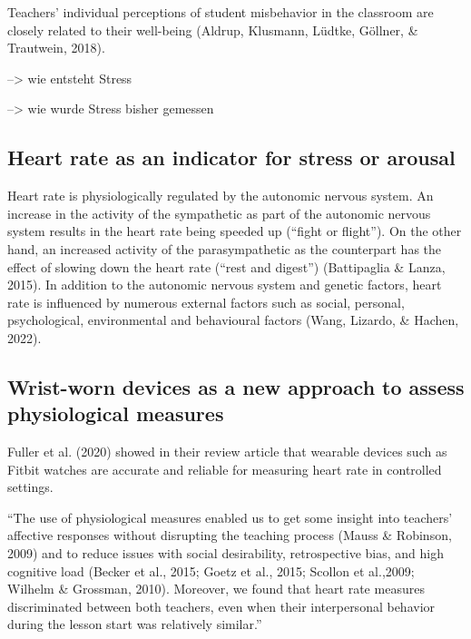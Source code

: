 \documentclass[
  man,floatsintext]{apa6}
\begin{document}
Teachers' individual perceptions of student misbehavior in the classroom are closely related to their well-being (Aldrup, Klusmann, Lüdtke, Göllner, \& Trautwein, 2018).

--\textgreater{} wie entsteht Stress

--\textgreater{} wie wurde Stress bisher gemessen

\hypertarget{heart-rate-as-an-indicator-for-stress-or-arousal}{%
\subsection{Heart rate as an indicator for stress or arousal}\label{heart-rate-as-an-indicator-for-stress-or-arousal}}

Heart rate is physiologically regulated by the autonomic nervous system. An increase in the activity of the sympathetic as part of the autonomic nervous system results in the heart rate being speeded up (``fight or flight''). On the other hand, an increased activity of the parasympathetic as the counterpart has the effect of slowing down the heart rate (``rest and digest'') (Battipaglia \& Lanza, 2015). In addition to the autonomic nervous system and genetic factors, heart rate is influenced by numerous external factors such as social, personal, psychological, environmental and behavioural factors (Wang, Lizardo, \& Hachen, 2022).

\hypertarget{wrist-worn-devices-as-a-new-approach-to-assess-physiological-measures}{%
\subsection{Wrist-worn devices as a new approach to assess physiological measures}\label{wrist-worn-devices-as-a-new-approach-to-assess-physiological-measures}}

Fuller et al. (2020) showed in their review article that wearable devices such as Fitbit watches are accurate and reliable for measuring heart rate in controlled settings.

``The use of physiological measures enabled us to get some insight into teachers' affective responses without disrupting the teaching process (Mauss \& Robinson, 2009) and to reduce issues with social desirability, retrospective bias, and high cognitive load (Becker et al., 2015; Goetz et al., 2015; Scollon et al.,2009; Wilhelm \& Grossman, 2010). Moreover, we found that heart rate measures discriminated between both teachers, even when their interpersonal behavior during the lesson start was relatively similar.''
\end{document}

